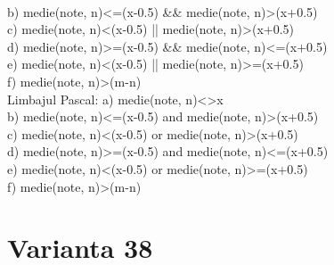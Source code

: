 \begin{itemize}
\begin{enumerate}
\\
b) medie(note, n)<=(x-0.5) \&\& medie(note, n)>(x+0.5)
\\
c) medie(note, n)<(x-0.5) || medie(note, n)>(x+0.5)
\\
d) medie(note, n)>=(x-0.5) \&\& medie(note, n)<=(x+0.5)
\\
e) medie(note, n)<(x-0.5) || medie(note, n)>=(x+0.5)
\\
f) medie(note, n)>(m-n)
\\
Limbajul Pascal:
a) medie(note, n)<>x
\\
b) medie(note, n)<=(x-0.5) and medie(note, n)>(x+0.5)
\\
c) medie(note, n)<(x-0.5) or medie(note, n)>(x+0.5)
\\
d) medie(note, n)>=(x-0.5) and medie(note, n)<=(x+0.5)
\\
e) medie(note, n)<(x-0.5) or medie(note, n)>=(x+0.5)
\\
f) medie(note, n)>(m-n)
\\

\section*{Varianta 38}


\end{enumerate}
\end{itemize}
